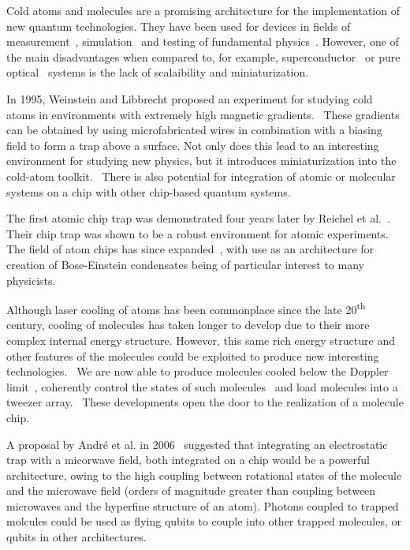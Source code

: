Cold atoms and molecules are a promising architecture for the implementation of
new quantum technologies. They have been used for devices in fields of
measurement~\cite{Campbell90}, simulation~\cite{Gross995} and testing of
fundamental physics~\cite{DeMille990}. However, one of the
main disadvantages when compared to, for example,
superconductor~\cite{Wallraff2004} or
pure optical~\cite{Browne2017} systems is the lack of
scalaibility and miniaturization.~\cite{nielsenandchuang}

In 1995, Weinstein and Libbrecht proposed an experiment for
studying cold atoms in environments with extremely high magnetic
gradients.~\cite{PhysRevA.52.4004} These gradients can be obtained by using
microfabricated wires in combination with a biasing field to form a trap above
a surface. Not only does this lead to an interesting environment for studying
new physics, but it introduces miniaturization into the cold-atom
toolkit.~\cite{2011Ac} There is also potential for integration of atomic or
molecular systems on a chip with other chip-based quantum
systems.~\cite{2011Ac, Kubo2011}

The first atomic chip trap was demonstrated four years later by Reichel et
al.~\cite{Reichel1999}. Their chip trap was shown to be a robust environment for
atomic experiments. The field of atom chips has since expanded~\cite{2011Ac},
with use as an architecture for creation of Bose-Einstein condensates being of
particular interest to many physicists.~\cite{Ott2001}

Although laser cooling of atoms has been commonplace since the late
20\textsuperscript{th} century, cooling of molecules has taken longer to develop
due to their more complex internal energy structure. However, this same rich
energy structure and other features of the molecules could be exploited to
produce new interesting technologies.~\cite{Tarbutt2018} We are now able to
produce \CaF{} molecules cooled below the Doppler limit~\cite{Truppe2017},
coherently control the states of such molecules~\cite{Williams2018}
and load molecules into a tweezer array.~\cite{Anderegg2019} These developments
open the door to the realization of a molecule chip.

A proposal by Andr\'e et al. in 2006~\cite{Andre2006} suggested that integrating
an electrostatic trap with a micorwave field, both integrated on a chip would be
a powerful architecture, owing to the high coupling between rotational states of
the molecule and the microwave field (orders of magnitude greater than coupling
between microwaves and the hyperfine structure of an atom). Photons coupled to
trapped molcules could be used as flying qubits to couple into other trapped
molecules, or qubits in other architectures.~\cite{PhysRevLett.92.063601}


